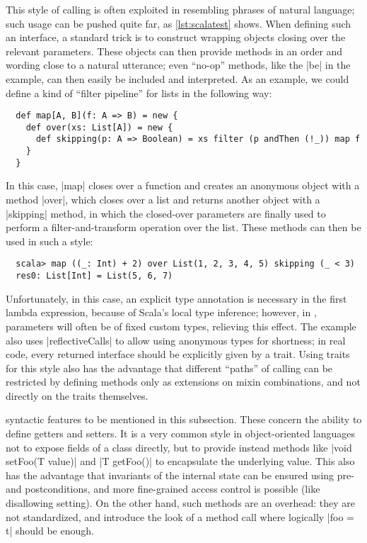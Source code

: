This style of calling is often exploited in \dsls{} resembling phrases of natural language; such
usage can be pushed quite far, as \autoref{lst:scalatest} shows. When defining such an interface, a
standard trick is to construct wrapping objects closing over the relevant parameters. These objects
can then provide methods in an order and wording close to a natural utterance; even \enquote{no-op}
methods, like the |be| in the example, can then easily be included and interpreted. As an example,
we could define a kind of \enquote{filter pipeline} for lists in the following way:
\begin{lstlisting}
  def map[A, B](f: A => B) = new {
    def over(xs: List[A]) = new {
      def skipping(p: A => Boolean) = xs filter (p andThen (!_)) map f
    }
  }
\end{lstlisting}
In this case, |map| closes over a function and creates an anonymous object with a method |over|,
which closes over a list and returns another object with a |skipping| method, in which the
closed-over parameters are finally used to perform a filter-and-transform operation over the
list. These methods can then be used in such a style:
\begin{lstlisting}
  scala> map ((_: Int) + 2) over List(1, 2, 3, 4, 5) skipping (_ < 3)
  res0: List[Int] = List(5, 6, 7)
\end{lstlisting}
Unfortunately, in this case, an explicit type annotation is necessary in the first lambda
expression, because of Scala's local type inference; however, in \dsls{}, parameters will often be
of fixed custom types, relieving this effect. The example also uses |reflectiveCalls| to allow using
anonymous types for shortness; in real code, every returned interface should be explicitly given by
a trait. Using traits for this style also has the advantage that different \enquote{paths} of
calling can be restricted by defining methods only as extensions on mixin combinations, and not
directly on the traits themselves.

 syntactic features to be mentioned in this subsection. These
concern the ability to define getters and setters. It is a very common style in object-oriented
languages not to expose fields of a class directly, but to provide instead methods like %
|void setFoo(T value)| and |T getFoo()| to encapsulate the underlying value. This also has the
advantage that invariants of the internal state can be ensured using pre- and postconditions, and
more fine-grained access control is possible (like disallowing setting). On the other hand, such
methods are an overhead: they are not standardized, and introduce the look of a method call where
logically |foo = t| should be enough.

